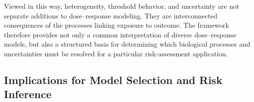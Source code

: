 \documentclass[11pt]{article}
\begin{document}
Viewed in this way, heterogeneity, threshold behavior, and uncertainty
are not separate additions to dose--response modeling. They are
interconnected consequences of the processes linking exposure to
outcome. The framework therefore provides not only a common
interpretation of diverse dose--response models, but also a structured
basis for determining which biological processes and uncertainties must
be resolved for a particular risk-assessment application.

%
%
%
%
%

\subsection{Implications for Model Selection and Risk Inference}
\end{document}
